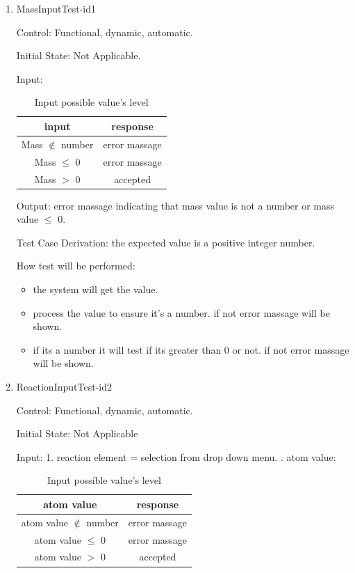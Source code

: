 \documentclass[12pt, titlepage]{article}
\begin{document}
\begin{enumerate}

\item{MassInputTest-id1\\}

Control: Functional, dynamic, automatic.
					
Initial State: Not Applicable.
					
Input: 
\begin{table}[h!]
\centering
\begin{tabular}{|c|c|}
\hline
input & response  \\
\hline
Mass $\notin$ number  & error massage \\ \hline
Mass $\leq$ 0& error massage \\ \hline
Mass $>$ 0  & accepted\\ \hline
\hline
\end{tabular}
\caption{Input possible value's level }
\label{tab:reqtrace}
\end{table}

					
Output: error massage indicating that mass value is not a number or mass value $\leq$ 0. 

Test Case Derivation: the expected value is a positive integer number. 
					
How test will be performed: 
\begin{itemize}
\item the system will get the value. 
\item process the value to ensure it's a number. if not error massage will be shown.
\item if its a number it will test if its greater than 0 or not.  if not error massage will be shown.
\end{itemize}



\item{ReactionInputTest-id2\\}

Control: Functional, dynamic, automatic.
					
Initial State: Not Applicable
					
Input: 
1. reaction element = selection from drop down menu.
. atom value: 
\begin{table}[h!]
\centering
\begin{tabular}{|c|c|}
\hline
atom value & response  \\
\hline
atom value $\notin$ number  & error massage \\ \hline
atom value $\leq$ 0& error massage \\ \hline
atom value $>$ 0  & accepted\\ \hline
\hline
\end{tabular}
\caption{Input possible value's level }
\label{tab:reqtrace}
\end{table}
	

\end{enumerate}
\end{document}

